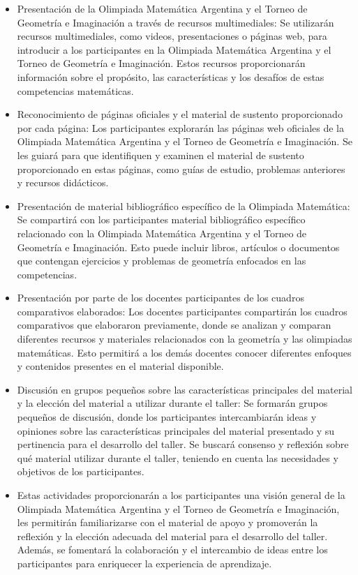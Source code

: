 \begin{itemize}
	\item Presentación de la Olimpiada Matemática Argentina y el Torneo de Geometría e Imaginación a través de recursos multimediales: Se utilizarán recursos multimediales, como videos, presentaciones o páginas web, para introducir a los participantes en la Olimpiada Matemática Argentina y el Torneo de Geometría e Imaginación. Estos recursos proporcionarán información sobre el propósito, las características y los desafíos de estas competencias matemáticas.
	\item Reconocimiento de páginas oficiales y el material de sustento proporcionado por cada página: Los participantes explorarán las páginas web oficiales de la Olimpiada Matemática Argentina y el Torneo de Geometría e Imaginación. Se les guiará para que identifiquen y examinen el material de sustento proporcionado en estas páginas, como guías de estudio, problemas anteriores y recursos didácticos. \textcite{oma2023}
	\item Presentación de material bibliográfico específico de la Olimpiada Matemática: Se compartirá con los participantes material bibliográfico específico relacionado con la Olimpiada Matemática Argentina y el Torneo de Geometría e Imaginación. Esto puede incluir libros, artículos o documentos que contengan ejercicios y problemas de geometría enfocados en las competencias.
	\item Presentación por parte de los docentes participantes de los cuadros comparativos elaborados: Los docentes participantes compartirán los cuadros comparativos que elaboraron previamente, donde se analizan y comparan diferentes recursos y materiales relacionados con la geometría y las olimpiadas matemáticas. Esto permitirá a los demás docentes conocer diferentes enfoques y contenidos presentes en el material disponible.
	\item Discusión en grupos pequeños sobre las características principales del material y la elección del material a utilizar durante el taller: Se formarán grupos pequeños de discusión, donde los participantes intercambiarán ideas y opiniones sobre las características principales del material presentado y su pertinencia para el desarrollo del taller. Se buscará consenso y reflexión sobre qué material utilizar durante el taller, teniendo en cuenta las necesidades y objetivos de los participantes.
	\item Estas actividades proporcionarán a los participantes una visión general de la Olimpiada Matemática Argentina y el Torneo de Geometría e Imaginación, les permitirán familiarizarse con el material de apoyo y promoverán la reflexión y la elección adecuada del material para el desarrollo del taller. Además, se fomentará la colaboración y el intercambio de ideas entre los participantes para enriquecer la experiencia de aprendizaje.
\end{itemize}


